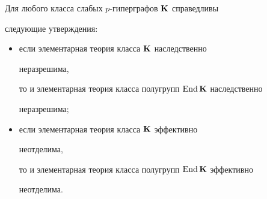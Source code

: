 \begin{thm} 


Для любого класса слабых $p$-гиперграфов $\bold K$ справедливы 


следующие утверж\-де\-ния$:$ 


\begin{itemize} 


\item[(i)] если элементарная теория класса $\bold K$ наследственно 


неразрешима, 


то и элементарная теория класса полугрупп $\operatorname{End}\bold K$ наследственно 


неразрешима$;$ 


\item[(ii)] если элементарная теория класса $\bold K$ эффективно 


неотделима, 


то и элементарная теория класса полугрупп $\operatorname{End}\bold K$ эффективно 


неотделима. 


\end{itemize} 


\end{thm} 


 


